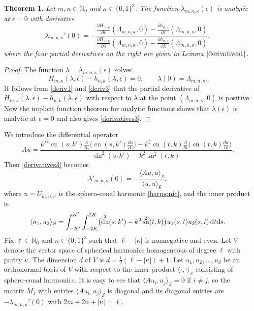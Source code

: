 \documentclass[10pt,a4paper]{amsart}
\newtheorem{thm}{Theorem}[section]
\newcommand{\N}{\mathbb{N}}
\newcommand{\Sp}{\mathcal{S}}
\DeclareMathOperator{\sn}{sn}
\DeclareMathOperator{\cn}{cn}
\DeclareMathOperator{\dn}{dn}
\numberwithin{equation}{section}
\begin{document}
\begin{thm}%
Let $m,n\in\N_0$ and $\kappa\in\{0,1\}^3$. The function $\lambda_{m,n,\kappa}(\epsilon)$ is analytic at $\epsilon=0$
with derivative
\begin{equation}\label{derivatives3}
 \lambda_{m,n,\kappa}'(0)=
-\frac{ \frac{\partial H_{m,\kappa}}{\partial \epsilon}(\Lambda_{m,n,\kappa},0)-\frac{\partial h_{n,\kappa}}{\partial \epsilon}(\Lambda_{m,n,\kappa},0)}{ \frac{\partial H_{m,\kappa}}{\partial \lambda}(\Lambda_{m,n,\kappa},0)-\frac{\partial h_{n,\kappa}}{\partial \lambda}(\Lambda_{m,n,\kappa},0)},
\end{equation}
where the four partial derivatives on the right are given in Lemma $\ref{derivatives1}$.
\end{thm}
\begin{proof}
The function $\lambda=\lambda_{m,n,\kappa}(\epsilon)$ solves
\[ H_{m,\kappa}(\lambda,\epsilon)-h_{n,\kappa}(\lambda,\epsilon) =0,\qquad \lambda(0)=\Lambda_{m,n,\kappa}.\]
It follows from \eqref{deriv1} and \eqref{deriv3} that the partial derivative of $H_{m,\kappa}(\lambda,\epsilon)-h_{n,\kappa}(\lambda,\epsilon)$ with respect to $\lambda$ at the point $(\Lambda_{m,n,\kappa},0)$ is positive.
Now the implicit function theorem for analytic functions shows that $\lambda(\epsilon)$ is analytic at $\epsilon=0$ and
also gives \eqref{derivatives3}.
\end{proof}

We introduce the differential operator
\[ Au=\frac{k'^2\cn(s,k')\frac{\partial}{\partial s}\bigl( \cn(s,k')\frac{\partial u}{\partial s}\bigr)-k^2\cn(t,k)\frac{\partial}{\partial t}\bigl( \cn(t,k)\frac{\partial u}{\partial t}\bigr)}
{\dn^2(s,k')-k^2\sn^2(t,k)}.
\]
Then \eqref{derivatives3} becomes
\[ \lambda'_{m,n,\kappa}(0)=-\frac{\langle Au,u\rangle_\Sp}{\langle u,u\rangle_\Sp},\]
where $u=U_{m,n,\kappa}$ is the sphero-conal harmonic \eqref{harmonic}, and
the inner product is
\[ \langle u_1,u_2\rangle_\Sp =\int_{-K'}^{K'}\int_{-2K}^{2K} \bigl(\dn^2(s,k')-k^2\sn^2(t,k)\bigr)u_1(s,t)u_2(s,t)\,{\rm d}t{\rm d}s.\]
Fix $\ell\in\N_0$ and $\kappa\in\{0,1\}^3$ such that $\ell-|\kappa|$ is nonnegative and even.
Let $V$ denote the vector space of spherical
harmonics homogeneous of degree $\ell$ with parity $\kappa$. The dimension $d$ of $V$ is $d=\frac12(\ell-|\kappa|)+1$.
Let $u_1,u_2,\dots,u_d$ be an orthonormal basis of $V$ with respect to the inner product $\langle\cdot,\cdot\rangle_\Sp$
consisting of sphero-conal harmonics.
It is easy to see that $\langle Au_i,u_j\rangle_\Sp=0$ if $i\ne j$, so the matrix $M_1$ with entries
$\langle Au_i,u_j\rangle_\Sp$ is diagonal and its diagonal entries are
$-\lambda_{m,n,\kappa}'(0)$ with $2m+2n+|\kappa|=\ell$.
\end{document}
